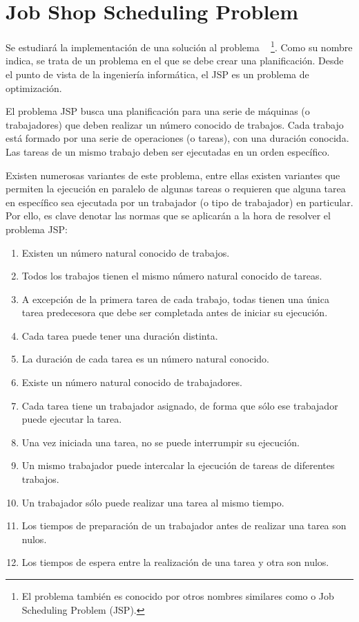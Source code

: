 
\section{Job Shop Scheduling Problem}

Se estudiará la implementación de una solución al problema
~\cite{Yan77}
\footnote{El problema también es conocido por otros nombres similares
como  o Job Scheduling Problem (JSP).}.
Como su nombre indica, se trata de un problema en el que se debe
crear una planificación.
Desde el punto de vista de la ingeniería informática,
el JSP es un problema de optimización.

El problema JSP busca una planificación para una serie de
máquinas (o trabajadores) que deben realizar un número conocido
de trabajos.
Cada trabajo está formado por una serie de operaciones (o tareas),
con una duración conocida.
Las tareas de un mismo trabajo deben ser ejecutadas en un orden específico.

Existen numerosas variantes de este problema,
entre ellas existen variantes que permiten la ejecución
en paralelo de algunas tareas o requieren que alguna tarea
en específico sea ejecutada por un trabajador (o tipo de trabajador)
en particular.
Por ello, es clave denotar las normas que se aplicarán a la hora de resolver
el problema JSP\@:

\begin{enumerate}[itemsep=0.25px]
    \item Existen un número natural conocido de trabajos.
    \item Todos los trabajos tienen el mismo número natural conocido de tareas.
    \item A excepción de la primera tarea de cada trabajo,
    todas tienen una única tarea predecesora que debe ser completada
    antes de iniciar su ejecución.
    \item Cada tarea puede tener una duración distinta.
    \item La duración de cada tarea es un número natural conocido.
    \item Existe un número natural conocido de trabajadores.
    \item Cada tarea tiene un trabajador asignado,
    de forma que sólo ese trabajador puede ejecutar la tarea.
    \item Una vez iniciada una tarea, no se puede interrumpir su ejecución.
    \item Un mismo trabajador puede intercalar la ejecución de tareas de diferentes trabajos.
    \item Un trabajador sólo puede realizar una tarea al mismo tiempo.
    \item Los tiempos de preparación de un trabajador antes de realizar una tarea son nulos.
    \item Los tiempos de espera entre la realización de una tarea y otra son nulos.
\end{enumerate}

